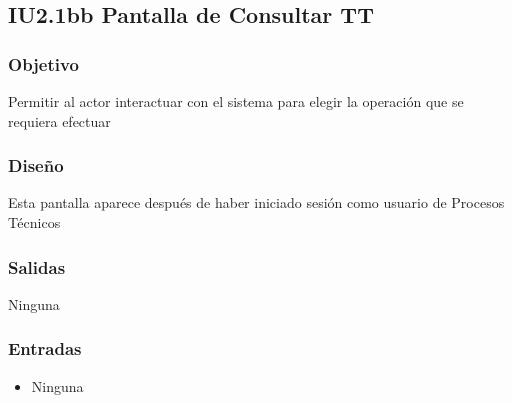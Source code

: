 \newpage
\subsection{IU2.1bb Pantalla de Consultar TT}

\subsubsection{Objetivo}
	Permitir al actor interactuar con el sistema para elegir la operación que se requiera efectuar

\subsubsection{Diseño}
	Esta pantalla aparece después de haber iniciado sesión como usuario de Procesos Técnicos 


\subsubsection{Salidas}
	\begin{Citemize}
	        \item Ninguna
	\end{Citemize}
	
\subsubsection{Entradas}
		\begin{itemize}
        	\item Ninguna
        \end{itemize}  